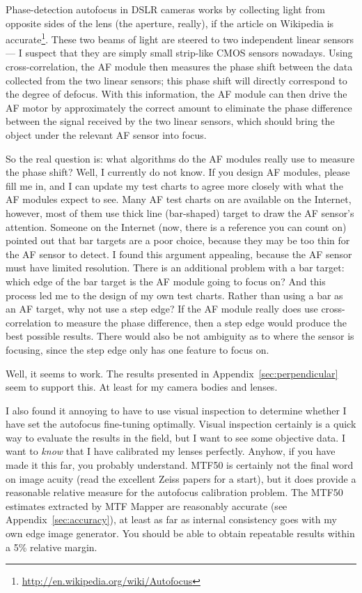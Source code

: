 \documentclass[a4paper]{article}
\begin{document}
Phase-detection autofocus in DSLR cameras works by collecting light from
opposite sides of the lens (the aperture, really), if the article on
Wikipedia is
accurate\footnote{\url{http://en.wikipedia.org/wiki/Autofocus}}. These two
beams of light are steered to two independent linear sensors --- I suspect
that they are simply small strip-like CMOS sensors nowadays. Using
cross-correlation, the AF module then measures the phase shift between the
data collected from the two linear sensors; this phase shift will directly
correspond to the degree of defocus. With this information, the AF module
can then drive the AF motor by approximately the correct amount to
eliminate the phase difference between the signal received by the two
linear sensors, which should bring the object under the relevant AF sensor
into focus.

So the real question is: what algorithms do the AF modules really use to
measure the phase shift? Well, I currently do not know. If you design AF
modules, please fill me in, and I can update my test charts to agree more
closely with what the AF modules expect to see. Many AF test charts on are
available on the Internet, however, most of them use thick line (bar-shaped)
target to draw the AF sensor's attention. Someone on the Internet (now,
there is a reference you can count on) pointed out that bar targets are a
poor choice, because they may be too thin for the AF sensor to detect. I
found this argument appealing, because the AF sensor must have limited
resolution. There is an additional problem with a bar target: which edge of
the bar target is the AF module going to focus on? And this process led me
to the design of my own test charts. Rather than using a bar as an AF
target, why not use a step edge? If the AF module really does use
cross-correlation to measure the phase difference, then a step edge would
produce the best possible results. There would also be not ambiguity as to
where the sensor is focusing, since the step edge only has one feature to
focus on.

Well, it seems to work. The results presented in
Appendix~\ref{sec:perpendicular} seem to support this. At least for my
camera bodies and lenses.

I also found it annoying to have to use visual inspection to determine
whether I have set the autofocus fine-tuning optimally. Visual
inspection certainly is a quick way to evaluate the results in the field, but I want to see some
objective data. I want to \emph{know} that I have calibrated my lenses
perfectly. Anyhow, if you have made it this far, you probably understand.
MTF50 is certainly not the final word on image acuity (read the excellent
Zeiss papers for a start), but it does provide a reasonable relative measure
for the autofocus calibration problem. The MTF50 estimates extracted by MTF
Mapper are reasonably accurate (see Appendix~\ref{sec:accuracy}), at least as
far as internal consistency goes with my own edge image generator. You should 
be able to obtain repeatable results within a 5\% relative margin.
\end{document}
